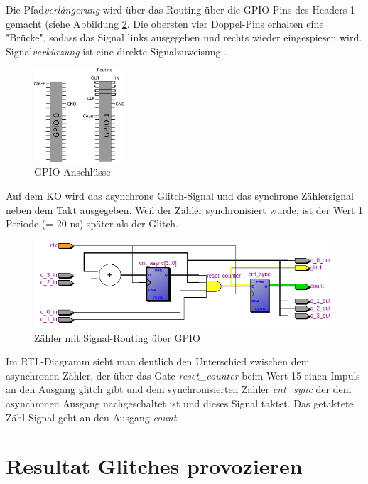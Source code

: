 Die Pfad\textit{verlängerung} wird über das Routing über die GPIO-Pins des Headers 1 gemacht (siehe Abbildung \ref{fig.glitch.routing}. Die obersten vier Doppel-Pins erhalten eine "Brücke", sodass das Signal links ausgegeben und rechts wieder eingespiesen wird.\\
Signal\textit{verkürzung} ist eine direkte Signalzuweisung  .\\
\begin{figure}[H]
	\centering
	\includegraphics[width=0.3\textwidth]{images/glitch/GPIO_Belegung.png}
	\caption{GPIO Anschlüsse}
	\label{fig.glitch.GPIO}
\end{figure}

Auf dem KO wird das asynchrone Glitch-Signal und das synchrone Zählersignal neben dem Takt ausgegeben. Weil der Zähler synchronisiert wurde, ist der Wert 1 Periode (= 20 ns) später als der Glitch.\\

\begin{figure}[H]
	\centering
	\includegraphics[width=\textwidth]{images/glitch/RTL_glitch_detection_bemalt.png}
	\caption{Zähler mit Signal-Routing über GPIO}
	\label{fig.glitch.routing}
\end{figure}
Im RTL-Diagramm sieht man deutlich den Unterschied zwischen dem asynchronen Zähler, der über das Gate \textit{reset\_{counter}} beim Wert 15 einen Impuls an den Ausgang glitch gibt und dem synchronisierten Zähler \textit{cnt\_{sync}} der dem asynchronen Ausgang nachgeschaltet ist und dieses Signal taktet. Das getaktete Zähl-Signal geht an den Ausgang \textit{count}.


	
\section{Resultat Glitches provozieren}\label{sect.glitch_resultat}

